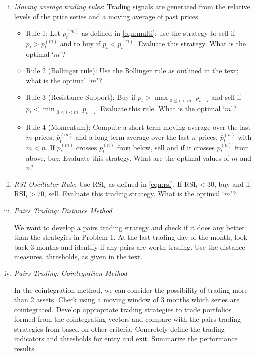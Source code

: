	\begin{enumerate}[(i)]
	\item{\it Moving average trading rules}: Trading signals are generated from the relative levels of the price series and a moving average of past prices.
		\begin{itemize}
		\item  Rule 1: Let $\overline{p}_t^{(m)}$ as defined in \eqref{eqn:multi}; use the strategy to sell if $p_t>\overline{p}_t^{(m)}$ and to buy if  $p_t<\overline{p}_t^{(m)}$. Evaluate this strategy. What is the optimal `$m$'?
		\item Rule 2 (Bollinger rule): Use the Bollinger rule as outlined in the text; what is the optimal `$m$'?
		\item Rule 3 (Resistance-Support): Buy if $p_t > \max_{\substack{0 \leq i< m}} p_{t-i}$ and sell if $p_t < \min_{\substack{0 \leq i < m}} p_{t-i}$. Evaluate this rule. What is the optimal `$m$'?
		\item Rule 4 (Momentum): Compute a short-term moving average over the last $m$ prices, $\overline{p}_t^{(m)}$ and a long-term average over the last $n$ prices, $\overline{p}_t^{(n)}$ with $m<n$. If $\overline{p}_t^{(m)}$ crosses $\overline{p}_t^{(n)}$ from below, sell and if it crosses $\overline{p}_t^{(n)}$ from above, buy. Evaluate this strategy. What are the optimal values of $m$ and $n$?
		\end{itemize}
	\item{\it RSI Oscillator Rule}: Use $\text{RSI}_t$ as defined in \eqref{eqn:rsi}. \hfill \break
If $\text{RSI}_t<30$, buy and if $\text{RSI}_t>70$, sell. Evaluate this trading strategy. What is the optimal `$m$'?

	\item {\it Pairs Trading: Distance Method}

We want to develop a pairs trading strategy and check if it does any better than  the strategies in Problem 1. At the last trading day of the month, look back 3 months and identify if any pairs are worth trading. Use the distance measures, thresholds, as given in the text.

	\item {\it Pairs Trading: Cointegration Method}

In the cointegration method, we can consider the possibility of trading more than 2 assets. Check using a moving window of 3 months which series are cointegrated. Develop appropriate trading strategies to trade portfolios formed from the cointegrating vectors and compare with the pairs trading strategies from based on other criteria. Concretely define the trading indicators and thresholds for entry and exit. Summarize the performance results.


\end{enumerate}
